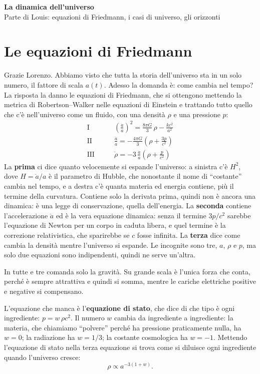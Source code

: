\documentclass[12pt,a4paper]{article}
\begin{document}
\begin{center}
{\Large\bfseries La dinamica dell'universo}\\[3pt]
{\large Parte di Louis: equazioni di Friedmann, i casi di universo, gli orizzonti}
\end{center}

\section{Le equazioni di Friedmann}
Grazie Lorenzo. Abbiamo visto che tutta la storia dell'universo sta in un solo numero, il fattore di scala $a(t)$. Adesso la domanda è: come cambia nel tempo? La risposta la danno le equazioni di Friedmann, che si ottengono mettendo la metrica di Robertson--Walker nelle equazioni di Einstein e trattando tutto quello che c'è nell'universo come un fluido, con una densità $\rho$ e una pressione $p$:
\begin{align*}
\text{I} \qquad & \left(\frac{\dot a}{a}\right)^2 = \frac{8\pi G}{3}\,\rho - \frac{k c^2}{a^2} \\[2pt]
\text{II} \qquad & \frac{\ddot a}{a} = -\frac{4\pi G}{3}\left(\rho + \frac{3p}{c^2}\right) \\[2pt]
\text{III} \qquad & \dot\rho = -3\,\frac{\dot a}{a}\left(\rho + \frac{p}{c^2}\right)
\end{align*}
La \textbf{prima} ci dice quanto velocemente si espande l'universo: a sinistra c'è $H^2$, dove $H = \dot a/a$ è il parametro di Hubble, che nonostante il nome di ``costante'' cambia nel tempo, e a destra c'è quanta materia ed energia contiene, più il termine della curvatura. Contiene solo la derivata prima, quindi non è ancora una dinamica: è una legge di conservazione, quella dell'energia. La \textbf{seconda} contiene l'accelerazione $\ddot a$ ed è la vera equazione dinamica: senza il termine $3p/c^2$ sarebbe l'equazione di Newton per un corpo in caduta libera, e quel termine è la correzione relativistica, che sparirebbe se $c$ fosse infinita. La \textbf{terza} dice come cambia la densità mentre l'universo si espande. Le incognite sono tre, $a$, $\rho$ e $p$, ma solo due equazioni sono indipendenti, quindi ne serve un'altra.

In tutte e tre comanda solo la gravità. Su grande scala è l'unica forza che conta, perché è sempre attrattiva e quindi si somma, mentre le cariche elettriche positive e negative si compensano.

L'equazione che manca è l'\textbf{equazione di stato}, che dice di che tipo è ogni ingrediente: $p = w\,\rho c^2$. Il numero $w$ cambia da ingrediente a ingrediente: la materia, che chiamiamo ``polvere'' perché ha pressione praticamente nulla, ha $w = 0$; la radiazione ha $w = 1/3$; la costante cosmologica ha $w = -1$. Mettendo l'equazione di stato nella terza equazione si trova come si diluisce ogni ingrediente quando l'universo cresce:
\[ \rho \propto a^{-3(1+w)} . \]
\end{document}
